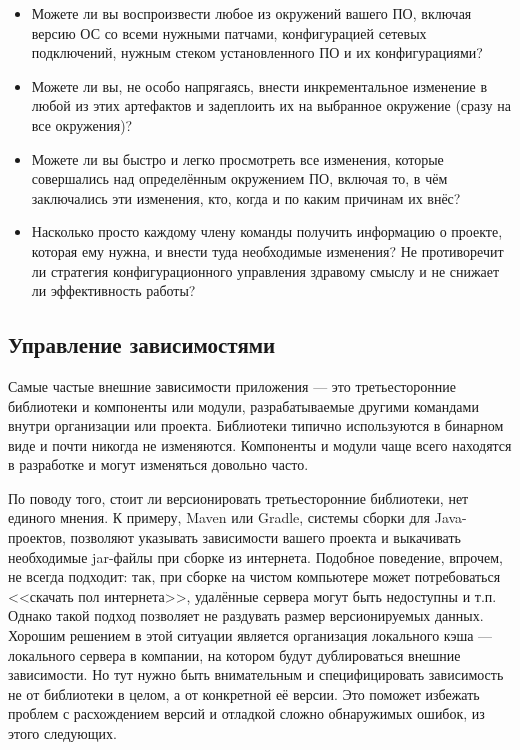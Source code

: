 \documentclass{../../text-style}
\begin{document}
\begin{itemize}
    \item Можете ли вы воспроизвести любое из окружений вашего ПО, включая версию ОС со всеми нужными патчами, конфигурацией сетевых подключений, нужным стеком установленного ПО и их конфигурациями?
    \item Можете ли вы, не особо напрягаясь, внести инкрементальное изменение в любой из этих артефактов и задеплоить их на выбранное окружение (сразу на все окружения)?
    \item Можете ли вы быстро и легко просмотреть все изменения, которые совершались над определённым окружением ПО, включая то, в чём заключались эти изменения, кто, когда и по каким причинам их внёс?
    \item Насколько просто каждому члену команды получить информацию о проекте, которая ему нужна, и внести туда необходимые изменения? Не противоречит ли стратегия конфигурационного управления здравому смыслу и не снижает ли эффективность работы?
\end{itemize}

\subsection{Управление зависимостями}

Самые частые внешние зависимости приложения --- это третьесторонние библиотеки и компоненты или модули, разрабатываемые другими командами внутри организации или проекта. Библиотеки типично используются в бинарном виде и почти никогда не изменяются. Компоненты и модули чаще всего находятся в разработке и могут изменяться довольно часто.

По поводу того, стоит ли версионировать третьесторонние библиотеки, нет единого мнения. К примеру, Maven или Gradle, системы сборки для Java-проектов, позволяют указывать зависимости вашего проекта и выкачивать необходимые jar-файлы при сборке из интернета. Подобное поведение, впрочем, не всегда подходит: так, при сборке на чистом компьютере может потребоваться <<скачать пол интернета>>, удалённые сервера могут быть недоступны и т.п. Однако такой подход позволяет не раздувать размер версионируемых данных. Хорошим решением в этой ситуации является организация локального кэша --- локального сервера в компании, на котором будут дублироваться внешние зависимости. Но тут нужно быть внимательным и специфицировать зависимость не от библиотеки в целом, а от конкретной её версии. Это поможет избежать проблем с расхождением версий и отладкой сложно обнаружимых ошибок, из этого следующих.
\end{document}
